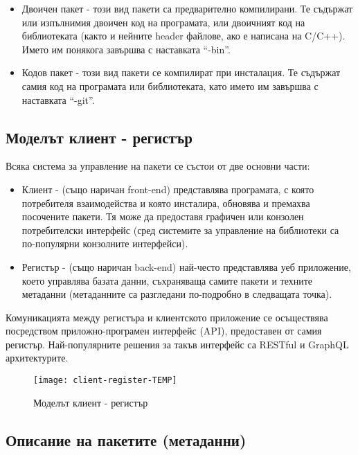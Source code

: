 \begin{itemize}
    \item Двоичен пакет - този вид пакети са предварително компилирани. Те
          съдържат или изпълнимия двоичен код на програмата, или двоичният код
          на библиотеката (както и нейните header файлове, ако е написана на
          C/C++). Името им понякога завършва с наставката ``-bin''.
    \item Кодов пакет - този вид пакети се компилират при инсталация. Те
          съдържат самия код на програмата или библиотеката, като името им
          завършва с наставката ``-git''.
\end{itemize}


\subsection{Моделът клиент - регистър}

Всяка система за управление на пакети се състои от две основни части:

\begin{itemize}
    \item Клиент - (също наричан front-end) представлява програмата, с която
          потребителя взаимодейства и която инсталира, обновява и премахва
          посочените пакети. Тя може да предоставя графичен или конзолен
          потребителски интерфейс (сред системите за управление на библиотеки са
          по-популярни конзолните интерфейси).
    \item Регистър - (също наричан back-end) най-често представлява уеб
          приложение, което управлява базата данни, съхраняваща самите пакети и
          техните метаданни (метаданните са разгледани по-подробно в следващата
          точка).
\end{itemize}

Комуникацията между регистъра и клиентското приложение се осъществява
посредством приложно-програмен интерфейс (API), предоставен от самия регистър.
Най-популярните решения за такъв интерфейс са RESTful и GraphQL архитектурите.

\begin{figure}[h]
    \centering
    \texttt{[image: client-register-TEMP]}
    \caption{Моделът клиент - регистър}
\end{figure}


\subsection{Описание на пакетите (метаданни)}

